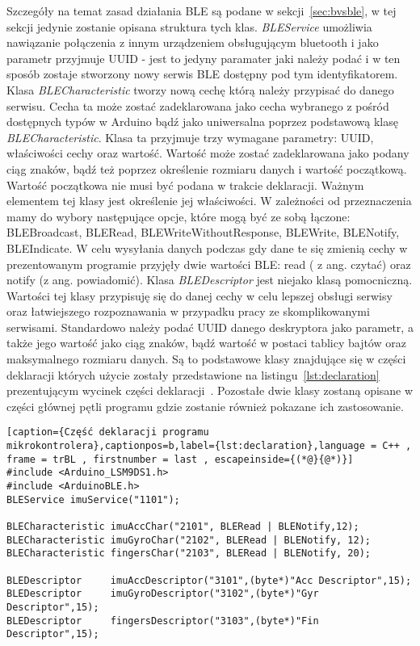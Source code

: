 Szczegóły na temat zasad działania BLE są podane w sekcji~\ref{sec:bvsble}, w tej sekcji jedynie zostanie opisana struktura tych klas. \textit{BLEService} umożliwia nawiązanie połączenia z innym urządzeniem obsługującym bluetooth i jako parametr przyjmuje UUID - jest to jedyny paramater jaki należy podać i w ten sposób zostaje stworzony nowy serwis BLE dostępny pod tym identyfikatorem. Klasa \textit{BLECharacteristic} tworzy nową cechę którą należy przypisać do danego serwisu. Cecha ta może zostać zadeklarowana jako cecha wybranego z pośród dostępnych typów w Arduino bądź jako uniwersalna poprzez podstawową klasę \textit{BLECharacteristic}. Klasa ta przyjmuje trzy wymagane parametry: UUID, właściwości cechy oraz wartość. Wartość może zostać zadeklarowana jako podany ciąg znaków, bądź też poprzez określenie rozmiaru danych i wartość początkową. Wartość początkowa nie musi być podana w trakcie deklaracji. Ważnym elementem tej klasy jest określenie jej właściwości. W zależności od przeznaczenia mamy do wybory następujące opcje, które mogą być ze sobą łączone: BLEBroadcast, BLERead, BLEWriteWithoutResponse, BLEWrite, BLENotify, BLEIndicate. W celu wysyłania danych podczas gdy dane te się zmienią cechy w prezentowanym programie przyjęły dwie wartości BLE: read ( z ang. czytać) oraz notify (z ang. powiadomić). Klasa \textit{BLEDescriptor} jest niejako klasą pomocniczną. Wartości tej klasy przypisuję się do danej cechy w celu lepszej obsługi serwisy oraz łatwiejszego rozpoznawania w przypadku pracy ze skomplikowanymi serwisami. Standardowo należy podać UUID danego deskryptora jako parametr, a także jego wartość jako ciąg znaków, bądź wartość w postaci tablicy bajtów oraz maksymalnego rozmiaru danych. Są to podstawowe klasy znajdujące się w części deklaracji których użycie zostały przedstawione na listingu~\ref{lst:declaration} prezentującym wycinek części deklaracji~\cite{ArduinoBLE}. Pozostałe dwie klasy zostaną opisane w części głównej pętli programu gdzie zostanie również pokazane ich zastosowanie. 

\begin{lstlisting}[caption={Część deklaracji programu mikrokontrolera},captionpos=b,label={lst:declaration},language = C++ , frame = trBL , firstnumber = last , escapeinside={(*@}{@*)}]
#include <Arduino_LSM9DS1.h>
#include <ArduinoBLE.h>
BLEService imuService("1101");

BLECharacteristic imuAccChar("2101", BLERead | BLENotify,12);
BLECharacteristic imuGyroChar("2102", BLERead | BLENotify, 12);
BLECharacteristic fingersChar("2103", BLERead | BLENotify, 20);

BLEDescriptor     imuAccDescriptor("3101",(byte*)"Acc Descriptor",15);
BLEDescriptor     imuGyroDescriptor("3102",(byte*)"Gyr Descriptor",15);
BLEDescriptor     fingersDescriptor("3103",(byte*)"Fin Descriptor",15);
\end{lstlisting}

